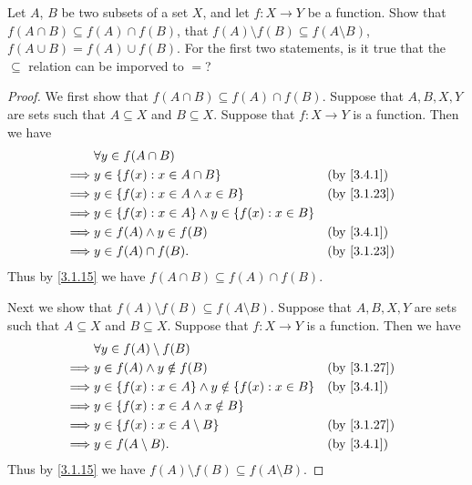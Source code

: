 \begin{ex}\label{ex:3.4.3}
  Let \(A\), \(B\) be two subsets of a set \(X\), and let \(f : X \to Y\) be a function.
  Show that \(f(A \cap B) \subseteq f(A) \cap f(B)\), that \(f(A) \setminus f(B) \subseteq f(A \setminus B)\), \(f(A \cup B) = f(A) \cup f(B)\).
  For the first two statements, is it true that the \(\subseteq\) relation can be imporved to \(=\)?
\end{ex}

\begin{proof}
  We first show that \(f(A \cap B) \subseteq f(A) \cap f(B)\).
  Suppose that \(A, B, X, Y\) are sets such that \(A \subseteq X\) and \(B \subseteq X\).
  Suppose that \(f : X \to Y\) is a function.
  Then we have
  \begin{align*}
             & \forall y \in f(A \cap B)                                                    \\
    \implies & y \in \set{f(x) : x \in A \cap B}                           &  & \by{3.4.1}  \\
    \implies & y \in \set{f(x) : x \in A \land x \in B}                    &  & \by{3.1.23} \\
    \implies & y \in \set{f(x) : x \in A} \land y \in \set{f(x) : x \in B}                  \\
    \implies & y \in f(A) \land y \in f(B)                                 &  & \by{3.4.1}  \\
    \implies & y \in f(A) \cap f(B).                                       &  & \by{3.1.23}
  \end{align*}
  Thus by \cref{3.1.15} we have \(f(A \cap B) \subseteq f(A) \cap f(B)\).

  Next we show that \(f(A) \setminus f(B) \subseteq f(A \setminus B)\).
  Suppose that \(A, B, X, Y\) are sets such that \(A \subseteq X\) and \(B \subseteq X\).
  Suppose that \(f : X \to Y\) is a function.
  Then we have
  \begin{align*}
             & \forall y \in f(A) \setminus f(B)                                               \\
    \implies & y \in f(A) \land y \notin f(B)                                 &  & \by{3.1.27} \\
    \implies & y \in \set{f(x) : x \in A} \land y \notin \set{f(x) : x \in B} &  & \by{3.4.1}  \\
    \implies & y \in \set{f(x) : x \in A \land x \notin B}                                     \\
    \implies & y \in \set{f(x) : x \in A \setminus B}                         &  & \by{3.1.27} \\
    \implies & y \in f(A \setminus B).                                        &  & \by{3.4.1}
  \end{align*}
  Thus by \cref{3.1.15} we have \(f(A) \setminus f(B) \subseteq f(A \setminus B)\).


\end{proof}
